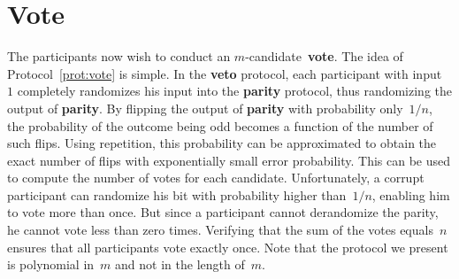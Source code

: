\documentclass[11pt]{article}
\begin{document}
\section{Vote}
\label{sec:vote}



The participants now wish to conduct an $m$-candidate~\textbf{vote}.
The idea of Protocol~\ref{prot:vote} is simple. In the \textbf{veto}
protocol, each participant with input~$1$ completely randomizes his
input into the \textbf{parity} protocol, thus randomizing the output
of \textbf{parity}. By flipping the output of \textbf{parity}
 with probability only~$1/n$, the
probability of the outcome being odd becomes a function of the
number of such flips. Using repetition, this probability can be
approximated to obtain the exact number of flips with exponentially
small error probability. This can be used to compute the number of
votes for each candidate. Unfortunately, a corrupt participant can
randomize his bit with probability higher than~$1/n$, enabling him
to vote more than once. But  since a participant cannot derandomize
the parity, he cannot vote less than zero times. Verifying that the
sum of the  votes equals~$n$ ensures that all participants vote
exactly once. Note that the protocol we present is polynomial in~$m$
and not in the length of~$m$.
\end{document}
